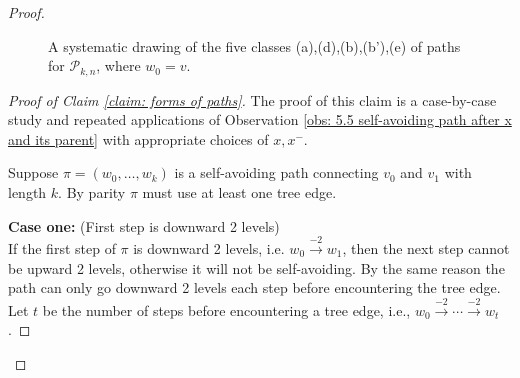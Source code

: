 \documentclass[12pt]{article}
\numberwithin{equation}{section}
\newcommand{\1}{\mathbf{1}}
\begin{document}
\begin{proof}
\begin{figure}[h!]
 	\caption{A systematic drawing of the five classes (a),(d),(b),(b'),(e) of paths for $\mathscr{P}_{k,n}$, where $w_0=v$.}
 	\label{fig: five classes adbee' of paths}
 	
 \end{figure}
 
 
 
 
 
 
 
 
 
 
 
 
 
 
 
 
 
 
 
 
 
 
 
 
 
 	
 \begin{proof}[Proof of Claim \ref{claim: forms of paths}]
The proof of this claim is a case-by-case study and repeated applications of Observation \ref{obs: 5.5 self-avoiding path after x and its parent} with appropriate choices of $x,x^-$.

 Suppose $\pi=(w_0,\ldots,w_k)$ is a self-avoiding path connecting $v_0$ and $v_1$ with length $k$. By parity $\pi$ must use at least one tree edge. %
 
 \textbf{Case one:} (First step is downward 2 levels)\\
 If the first step of $\pi$ is downward 2 levels, i.e. $w_0\stackrel{-2}{\rightarrow}w_1$, then the next step cannot be upward 2 levels, otherwise it will not be self-avoiding. By the same reason the path can only go downward 2 levels  each step before encountering the tree edge.
Let $t$ be the number of steps before encountering a tree edge, i.e., $w_0\stackrel{-2}{\rightarrow}\cdots \stackrel{-2}{\rightarrow}w_{t}$. 


\end{proof}
\end{proof}
\end{document}
